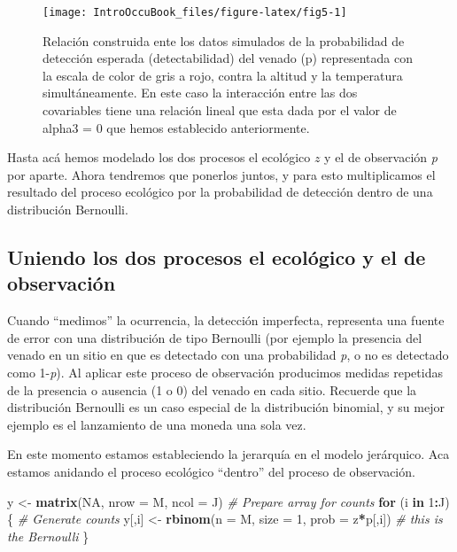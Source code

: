 \documentclass[
]{book}
\newenvironment{Shaded}{\begin{snugshade}}{\end{snugshade}}
\newcommand{\CommentTok}[1]{\textcolor[rgb]{0.56,0.35,0.01}{\textit{#1}}}
\newcommand{\ControlFlowTok}[1]{\textcolor[rgb]{0.13,0.29,0.53}{\textbf{#1}}}
\newcommand{\DataTypeTok}[1]{\textcolor[rgb]{0.13,0.29,0.53}{#1}}
\newcommand{\DecValTok}[1]{\textcolor[rgb]{0.00,0.00,0.81}{#1}}
\newcommand{\KeywordTok}[1]{\textcolor[rgb]{0.13,0.29,0.53}{\textbf{#1}}}
\newcommand{\NormalTok}[1]{#1}
\newcommand{\OperatorTok}[1]{\textcolor[rgb]{0.81,0.36,0.00}{\textbf{#1}}}
\newcommand{\OtherTok}[1]{\textcolor[rgb]{0.56,0.35,0.01}{#1}}
\newcommand{\StringTok}[1]{\textcolor[rgb]{0.31,0.60,0.02}{#1}}
\begin{document}
\begin{figure}
\texttt{[image: IntroOccuBook\_files/figure-latex/fig5-1]} \caption[fig5]{Relación construida ente los datos simulados de la probabilidad de detección esperada (detectabilidad) del venado (p) representada con la escala de color de gris a rojo, contra la altitud y la temperatura simultáneamente. En este caso la interacción entre las dos covariables tiene una relación lineal que esta dada por el valor de alpha3 = 0 que hemos establecido anteriormente.}\label{fig:fig5}
\end{figure}

Hasta acá hemos modelado los dos procesos el ecológico \(z\) y el de observación \emph{p} por aparte. Ahora tendremos que ponerlos juntos, y para esto multiplicamos el resultado del proceso ecológico por la probabilidad de detección dentro de una distribución Bernoulli.

\hypertarget{uniendo-los-dos-procesos-el-ecoluxf3gico-y-el-de-observaciuxf3n}{%
\subsection{Uniendo los dos procesos el ecológico y el de observación}\label{uniendo-los-dos-procesos-el-ecoluxf3gico-y-el-de-observaciuxf3n}}

Cuando ``medimos'' la ocurrencia, la detección imperfecta, representa una fuente de error con una distribución de tipo Bernoulli (por ejemplo la presencia del venado en un sitio en que es detectado con una probabilidad \emph{p}, o no es detectado como 1-\emph{p}). Al aplicar este proceso de observación producimos medidas repetidas de la presencia o ausencia (1 o 0) del venado en cada sitio. Recuerde que la distribución Bernoulli es un caso especial de la distribución binomial, y su mejor ejemplo es el lanzamiento de una moneda una sola vez.

En este momento estamos estableciendo la jerarquía en el modelo jerárquico. Aca estamos anidando el proceso ecológico ``dentro'' del proceso de observación.

\begin{Shaded}
\begin{Highlighting}[]
\NormalTok{y <-}\StringTok{ }\KeywordTok{matrix}\NormalTok{(}\OtherTok{NA}\NormalTok{, }\DataTypeTok{nrow =}\NormalTok{ M, }\DataTypeTok{ncol =}\NormalTok{ J)      }\CommentTok{# Prepare array for counts}
\ControlFlowTok{for}\NormalTok{ (i }\ControlFlowTok{in} \DecValTok{1}\OperatorTok{:}\NormalTok{J)\{                          }\CommentTok{# Generate counts}
\NormalTok{   y[,i] <-}\StringTok{ }\KeywordTok{rbinom}\NormalTok{(}\DataTypeTok{n =}\NormalTok{ M, }\DataTypeTok{size =} \DecValTok{1}\NormalTok{, }\DataTypeTok{prob =}\NormalTok{ z}\OperatorTok{*}\NormalTok{p[,i])   }\CommentTok{# this is the Bernoulli}
\NormalTok{\}}
\end{Highlighting}
\end{Shaded}
\end{document}
